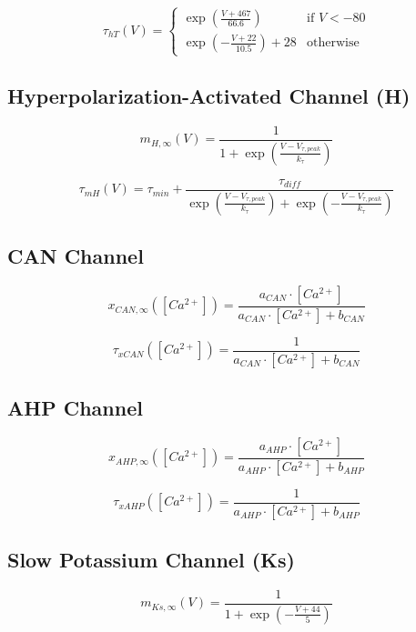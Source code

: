 \documentclass{article}
\begin{document}
\begin{equation}
\tau_{hT}(V) = 
\begin{cases} 
\exp\left(\frac{V + 467}{66.6}\right) & \text{if } V < -80 \\
\exp\left(-\frac{V + 22}{10.5}\right) + 28 & \text{otherwise}
\end{cases}
\end{equation}

\subsection*{Hyperpolarization-Activated Channel (H)}
\begin{equation}
m_{H,\infty}(V) = \frac{1}{1 + \exp\left(\frac{V - V_{\tau,peak}}{k_{\tau}}\right)}
\end{equation}

\begin{equation}
\tau_{mH}(V) = \tau_{min} + \frac{\tau_{diff}}{\exp\left(\frac{V - V_{\tau,peak}}{k_{\tau}}\right) + \exp\left(-\frac{V - V_{\tau,peak}}{k_{\tau}}\right)}
\end{equation}

\subsection*{CAN Channel}
\begin{equation}
x_{CAN,\infty}([Ca^{2+}]) = \frac{a_{CAN} \cdot [Ca^{2+}]}{a_{CAN} \cdot [Ca^{2+}] + b_{CAN}}
\end{equation}

\begin{equation}
\tau_{xCAN}([Ca^{2+}]) = \frac{1}{a_{CAN} \cdot [Ca^{2+}] + b_{CAN}}
\end{equation}

\subsection*{AHP Channel}
\begin{equation}
x_{AHP,\infty}([Ca^{2+}]) = \frac{a_{AHP} \cdot [Ca^{2+}]}{a_{AHP} \cdot [Ca^{2+}] + b_{AHP}}
\end{equation}

\begin{equation}
\tau_{xAHP}([Ca^{2+}]) = \frac{1}{a_{AHP} \cdot [Ca^{2+}] + b_{AHP}}
\end{equation}

\subsection*{Slow Potassium Channel (Ks)}
\begin{equation}
m_{Ks,\infty}(V) = \frac{1}{1 + \exp\left(-\frac{V + 44}{5}\right)}
\end{equation}
\end{document}
